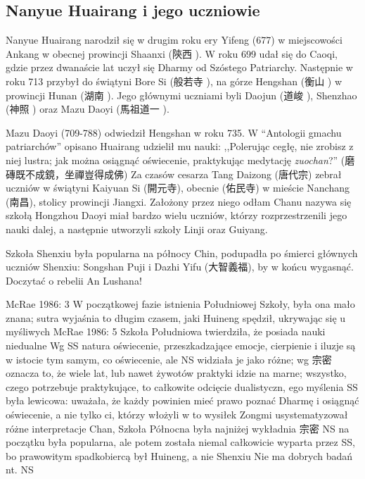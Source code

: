 \subsection{Nanyue Huairang i jego uczniowie}
Nanyue Huairang narodził się w drugim roku ery Yifeng (677) w miejscowości Ankang w obecnej prowincji Shaanxi (陝西 ).
W roku 699 udał się do Caoqi, gdzie przez dwanaście lat uczył się Dharmy od Szóstego Patriarchy.
Następnie w roku 713 przybył do świątyni Bore Si (般若寺 ), na górze Hengshan (衡山 ) w prowincji Hunan (湖南 ).
Jego głównymi uczniami byli Daojun (道峻 ), Shenzhao (神照 ) oraz Mazu Daoyi (馬祖道一 ).

Mazu Daoyi (709-788) odwiedził Hengshan w roku 735.
W ``Antologii gmachu patriarchów'' opisano
Huairang udzielił mu nauki: ,,Polerując cegłę, nie zrobisz z niej lustra; jak można osiągnąć oświecenie, praktykując medytację \textit{zuochan}?'' (磨磚既不成鏡，坐禪豈得成佛)
Za czasów cesarza Tang Daizong (唐代宗) zebrał uczniów w świątyni Kaiyuan Si (開元寺), obecnie (佑民寺) w mieście Nanchang (南昌), stolicy prowincji Jiangxi.
Założony przez niego odłam Chanu nazywa się szkołą Hongzhou
Daoyi miał bardzo wielu uczniów, którzy rozprzestrzenili jego nauki dalej, a następnie utworzyli szkoły Linji oraz Guiyang.


Szkoła Shenxiu była popularna na północy Chin, podupadła po śmierci głównych uczniów Shenxiu: Songshan Puji i Dazhi Yifu (大智義福), by w końcu wygasnąć. %
Doczytać o rebelii An Lushana!

McRae 1986: 3
W początkowej fazie istnienia Południowej Szkoły, była ona mało znana; sutra wyjaśnia to długim czasem, jaki Huineng spędził, ukrywając się u myśliwych
McRae 1986: 5
Szkoła Południowa twierdziła, że posiada nauki niedualne
Wg SS natura oświecenie, przeszkadzające emocje, cierpienie i iluzje są w istocie tym samym, co oświecenie, ale NS widziała je jako różne; wg 宗密 oznacza to, że wiele lat, lub nawet żywotów praktyki idzie na marne; wszystko, czego potrzebuje praktykujące, to całkowite odcięcie dualistyczn, ego myślenia
SS była lewicowa: uważała, że każdy powinien mieć prawo poznać Dharmę i osiągnąć oświecenie, a nie tylko ci, którzy włożyli w to wysiłek
Zongmi usystematyzował różne interpretacje Chan, Szkoła Północna była najniżej
wykładnia 宗密 NS na początku była popularna, ale potem została niemal całkowicie wyparta przez SS, bo prawowitym spadkobiercą był Huineng, a nie Shenxiu
Nie ma dobrych badań nt. NS


